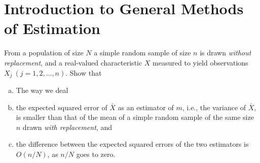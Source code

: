 \chapter{Introduction to General Methods of Estimation}
\begin{exer}
	From a population of size $N$ a simple random sample of size $n$ is drawn \textit{without replacement}, and a real-valued characteristic $X$ measured to yield observations $X_j~(j=1,2,\ldots,n)$. Show that
	\begin{enumerate}[(a)]
		\item 
		The way we deal
		\item the expected squared error of $\bar{X}$ as an estimator of $m$, i.e., the variance of $\bar{X}$, is smaller than that of the mean of a simple random sample of the same size $n$ drawn \textit{with replacement}, and
		\item the difference between the expected squared errors of the two estimators is $O(n/N)$, as $n/N$ goes to zero.
	\end{enumerate}
\end{exer}
